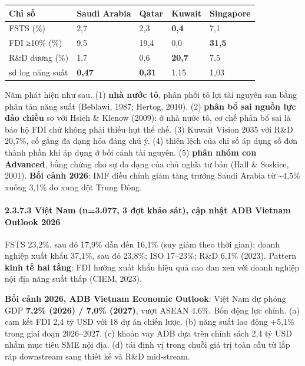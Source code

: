\documentclass[12pt,a4paper]{article}
\begin{document}
\begin{longtable}[]{@{}lllll@{}}
\toprule\noalign{}
Chỉ số & Saudi Arabia & Qatar & Kuwait & Singapore \\
\midrule\noalign{}
\endhead
\bottomrule\noalign{}
\endlastfoot
FSTS (\%) & 2,7 & 2,3 & \textbf{0,4} & 7,1 \\
FDI ≥10\% (\%) & 9,5 & 19,4 & 0,0 & \textbf{31,5} \\
R\&D dương (\%) & 1,7 & 0,6 & \textbf{20,7} & 7,5 \\
sd log năng suất & \textbf{0,47} & \textbf{0,31} & 1,15 & 1,03 \\
\end{longtable}

Năm phát hiện như sau. (1) \textbf{nhà nước tô}, phân phối tô lợi tài
nguyên san bằng phân tán năng suất (Beblawi, 1987; Hertog, 2010). (2)
\textbf{phân bổ sai nguồn lực đảo chiều} so với Hsieh \& Klenow (2009):
ở nhà nước tô, cơ chế phân bổ sai là bảo hộ FDI chứ không phải thiếu hụt
thể chế. (3) Kuwait Vision 2035 với R\&D 20,7\%, cố gắng đa dạng hóa
đáng chú ý. (4) thiên lệch của chỉ số áp dụng số đơn thành phần khi áp
dụng ở bối cảnh tài nguyên. (5) \textbf{phân nhóm con Advanced}, bằng
chứng cho sự đa dạng của chủ nghĩa tư bản (Hall \& Soskice, 2001).
\textbf{Bối cảnh 2026}: IMF điều chỉnh giảm tăng trưởng Saudi Arabia từ
\textasciitilde4,5\% xuống 3,1\% do xung đột Trung Đông.

\hypertarget{2373-viux1ec7t-nam-n3077-3-ux111ux1ee3t-khux1ea3o-suxe1t-cux1eadp-nhux1eadt-adb-vietnam-outlook-2026}{%
\paragraph{2.3.7.3 Việt Nam (n=3.077, 3 đợt khảo sát), cập nhật ADB
Vietnam Outlook
2026}\label{2373-viux1ec7t-nam-n3077-3-ux111ux1ee3t-khux1ea3o-suxe1t-cux1eadp-nhux1eadt-adb-vietnam-outlook-2026}}

FSTS 23,2\%, sau đó 17,9\% dẫn đến 16,1\% (suy giảm theo thời gian);
doanh nghiệp xuất khẩu 37,1\%, sau đó 23,8\%; ISO 17--23\%; R\&D 6,1\%
(2023). Pattern \textbf{kinh tế hai tầng}: FDI hướng xuất khẩu hiệu quả
cao đan xen với doanh nghiệp nội địa năng suất thấp (CIEM, 2023).

\textbf{Bối cảnh 2026, ADB Vietnam Economic Outlook}: Việt Nam dự phóng
GDP \textbf{7,2\% (2026) / 7,0\% (2027)}, vượt ASEAN 4,6\%. Bốn động lực
chính. (a) cam kết FDI 2,4 tỷ USD với 18 dự án chiến lược. (b) năng suất
lao động +5,1\% trong giai đoạn 2026--2027. (c) khoản vay ADB dựa trên
chính sách 2,4 tỷ USD nhắm mục tiêu SME nội địa. (d) tái định vị trong
chuỗi giá trị toàn cầu từ lắp ráp downstream sang thiết kế và R\&D
mid-stream.
\end{document}
